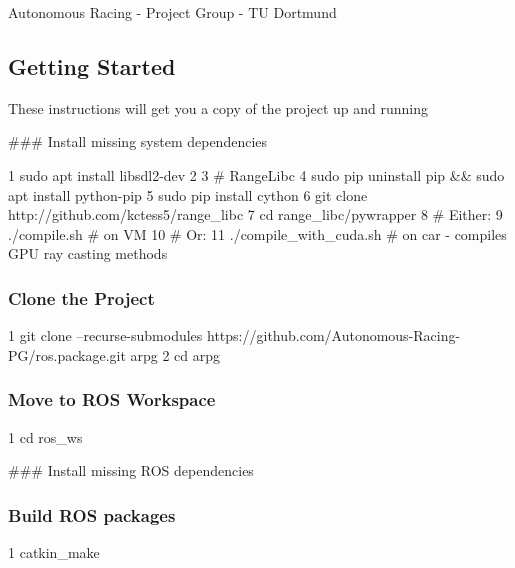 Autonomous Racing -\/ Project Group -\/ TU Dortmund

\href{https://travis-ci.com/Autonomous-Racing-PG/ros.package}{\tt }

\subsection*{Getting Started}

These instructions will get you a copy of the project up and running

\#\#\# Install missing system dependencies 
\begin{DoxyCode}
1 sudo apt install libsdl2-dev
2 
3 # RangeLibc
4 sudo pip uninstall pip && sudo apt install python-pip
5 sudo pip install cython
6 git clone http://github.com/kctess5/range\_libc
7 cd range\_libc/pywrapper
8 # Either:
9 ./compile.sh            # on VM
10 # Or:
11 ./compile\_with\_cuda.sh  # on car - compiles GPU ray casting methods
\end{DoxyCode}


\subsubsection*{Clone the Project}


\begin{DoxyCode}
1 git clone --recurse-submodules https://github.com/Autonomous-Racing-PG/ros.package.git arpg
2 cd arpg
\end{DoxyCode}


\subsubsection*{Move to R\+OS Workspace}


\begin{DoxyCode}
1 cd ros\_ws
\end{DoxyCode}


\#\#\# Install missing R\+OS dependencies 


\subsubsection*{Build R\+OS packages}


\begin{DoxyCode}
1 catkin\_make
\end{DoxyCode}


